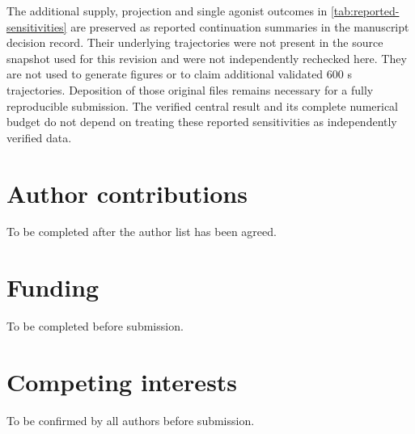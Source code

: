 \documentclass[11pt]{article}
\begin{document}
The additional supply, projection and single agonist outcomes in \cref{tab:reported-sensitivities} are preserved as reported continuation summaries in the manuscript decision record. Their underlying trajectories were not present in the source snapshot used for this revision and were not independently rechecked here. They are not used to generate figures or to claim additional validated 600 s trajectories. Deposition of those original files remains necessary for a fully reproducible submission. The verified central result and its complete numerical budget do not depend on treating these reported sensitivities as independently verified data.

\section*{Author contributions}
To be completed after the author list has been agreed.

\section*{Funding}
To be completed before submission.

\section*{Competing interests}
To be confirmed by all authors before submission.



\end{document}
